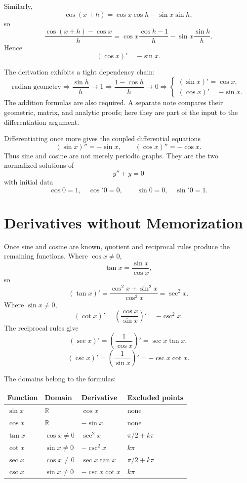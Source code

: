 Similarly,
\[
  \cos(x+h)=\cos x\cos h-\sin x\sin h,
\]
so
\[
  \frac{\cos(x+h)-\cos x}{h}
  =\cos x\frac{\cos h-1}{h}
   -\sin x\frac{\sin h}{h}.
\]
Hence
\[
  \boxed{(\cos x)'=-\sin x.}
\]

The derivation exhibits a tight dependency chain:
\[
  \text{radian geometry}
  \Longrightarrow
  \frac{\sin h}{h}\to1
  \Longrightarrow
  \frac{1-\cos h}{h}\to0
  \Longrightarrow
  \begin{cases}
    (\sin x)'=\cos x,\\
    (\cos x)'=-\sin x.
  \end{cases}
\]
The addition formulas are also required.  A separate note compares their geometric, matrix, and analytic proofs; here they are part of the input to the differentiation argument.

Differentiating once more gives the coupled differential equations
\[
  (\sin x)''=-\sin x,
  \qquad
  (\cos x)''=-\cos x.
\]
Thus sine and cosine are not merely periodic graphs.  They are the two normalized solutions of
\[
  y''+y=0
\]
with initial data
\[
  \cos0=1,
  \quad
  \cos'0=0,
  \qquad
  \sin0=0,
  \quad
  \sin'0=1.
\]

\section{Derivatives without Memorization}

Once sine and cosine are known, quotient and reciprocal rules produce the remaining functions.  Where \(\cos x\ne0\),
\[
  \tan x=\frac{\sin x}{\cos x},
\]
so
\[
  (\tan x)'
  =\frac{\cos^2x+\sin^2x}{\cos^2x}
  =\sec^2x.
\]
Where \(\sin x\ne0\),
\[
  (\cot x)'
  =\left(\frac{\cos x}{\sin x}\right)'
  =-\csc^2x.
\]
The reciprocal rules give
\[
  (\sec x)'
  =\left(\frac1{\cos x}\right)'
  =\sec x\tan x,
\]
\[
  (\csc x)'
  =\left(\frac1{\sin x}\right)'
  =-\csc x\cot x.
\]

The domains belong to the formulas:

\begin{center}
\small
\begin{tabularx}{\textwidth}{@{}lYYY@{}}
\toprule
Function & Domain & Derivative & Excluded points\\
\midrule
\(\sin x\) & \(\mathbb R\) & \(\cos x\) & none\\
\(\cos x\) & \(\mathbb R\) & \(-\sin x\) & none\\
\(\tan x\) & \(\cos x\ne0\) & \(\sec^2x\) & \(\pi/2+k\pi\)\\
\(\cot x\) & \(\sin x\ne0\) & \(-\csc^2x\) & \(k\pi\)\\
\(\sec x\) & \(\cos x\ne0\) & \(\sec x\tan x\) & \(\pi/2+k\pi\)\\
\(\csc x\) & \(\sin x\ne0\) & \(-\csc x\cot x\) & \(k\pi\)\\
\bottomrule
\end{tabularx}
\end{center}

